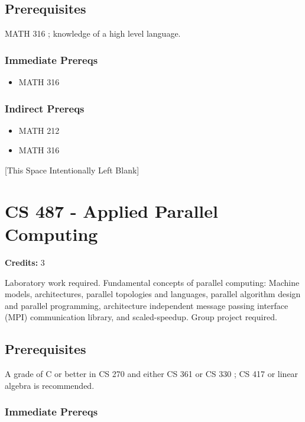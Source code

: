 \documentclass[]{article}
\providecommand{\tightlist}{%
  \setlength{\itemsep}{0pt}\setlength{\parskip}{0pt}}
\newcommand{\pagebreakhere}{
\vspace*{\fill}
\begin{center}
[This Space Intentionally Left Blank]
\end{center}
\vspace*{\fill}
\newpage
}
\begin{document}
\subsection{Prerequisites}\label{prerequisites-49}

MATH 316 ; knowledge of a high level language.

\subsubsection{Immediate Prereqs}\label{immediate-prereqs-40}

\begin{itemize}
\tightlist
\item
  MATH 316
\end{itemize}

\subsubsection{Indirect Prereqs}\label{indirect-prereqs-40}

\begin{itemize}
\tightlist
\item
  MATH 212
\item
  MATH 316
\end{itemize}

\pagebreakhere
\section{CS 487 - Applied Parallel
Computing}\label{cs-487---applied-parallel-computing}

\textbf{Credits:} 3

Laboratory work required. Fundamental concepts of parallel computing:
Machine models, architectures, parallel topologies and languages,
parallel algorithm design and parallel programming, architecture
independent message passing interface (MPI) communication library, and
scaled-speedup. Group project required.

\subsection{Prerequisites}\label{prerequisites-50}

A grade of C or better in CS 270 and either CS 361 or CS 330 ; CS 417 or
linear algebra is recommended.

\subsubsection{Immediate Prereqs}\label{immediate-prereqs-41}
\end{document}
